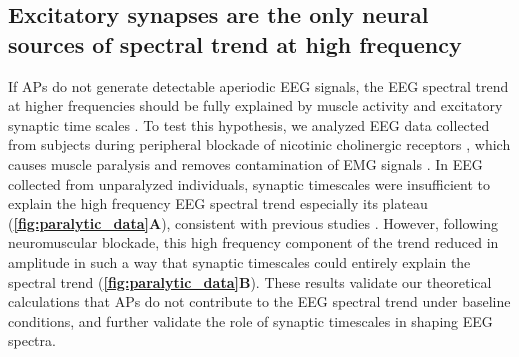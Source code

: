 \subsection{Excitatory synapses are the only neural sources of spectral trend at high frequency}
If APs do not generate detectable aperiodic EEG signals, the EEG spectral trend at higher frequencies should be fully explained by muscle activity \cite{Muthukumaraswamy2013} and excitatory synaptic time scales \cite{Brake2024, Gao2017}. To test this hypothesis, we analyzed EEG data collected from subjects during peripheral blockade of nicotinic cholinergic receptors \cite{Whitham2007}, which causes muscle paralysis and removes contamination of EMG signals \cite{Whitham2007, Fitzgibbon2013}. In EEG collected from unparalyzed individuals, synaptic timescales were insufficient to explain the high frequency EEG spectral trend especially its plateau (\textbf{\autoref{fig:paralytic_data}A}), consistent with previous studies \cite{Brake2024}. However, following neuromuscular blockade, this high frequency component of the trend reduced in amplitude in such a way that synaptic timescales could entirely explain the spectral trend (\textbf{\autoref{fig:paralytic_data}B}). These results validate our theoretical calculations that APs do not contribute to the EEG spectral trend under baseline conditions, and further validate the role of synaptic timescales in shaping EEG spectra.

